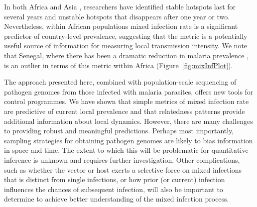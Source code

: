 \documentclass[9pt,lineno]{elife}
\begin{document}
In both Africa \citep{Bejon2010} and Asia \citep{Heng2017}, researchers have identified stable hotspots last for several years and unstable hotspots that disappears after one year or two. Nevertheless, within African populations mixed infection rate is a significant predictor of country-level prevalence, suggesting that the metric is a potentially useful source of information for measuring local transmission intensity.  We note that Senegal, where there has been a dramatic reduction in malaria prevalence \citep{Daniels2015}, is an outlier in terms of this metric within Africa (Figure~\ref{fig:mixInfPlot}).



The approach presented here, combined with population-scale sequencing of pathogen genomes from those infected with malaria parasites, offers new tools for control programmes.  We have shown that simple metrics of mixed infection rate are predictive of current local prevalence and that relatedness patterns provide additional information about local dynamics.  However, there are many challenges to providing robust and meaningful predictions.  Perhaps most importantly, sampling strategies for obtaining pathogen genomes are likely to bias information in space and time.  The extent to which this will be problematic for quantitative inference is unknown and requires further investigation.  Other complications, such as whether the vector or host exerts a selective force on mixed infections that is distinct from single infections, or how prior (or current) infection influences the chances of subsequent infection, will also be important to determine to achieve better understanding of the mixed infection process.
\end{document}
